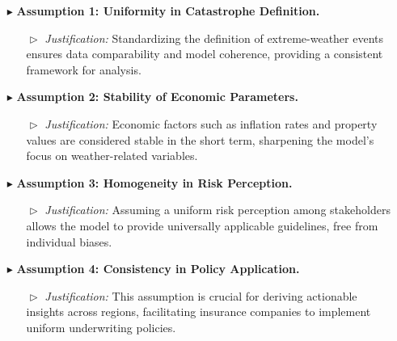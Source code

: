 \documentclass{mcmthesis}
\begin{document}
\begin{itemize}
    \item[$\blacktriangleright$] \textbf{Assumption 1: Uniformity in Catastrophe Definition.} 
        \begin{itemize}
            \item[$\vartriangleright$] \textit{Justification:} Standardizing the definition of extreme-weather events ensures data comparability and model coherence, providing a consistent framework for analysis.
        \end{itemize}
    
    \item[$\blacktriangleright$] \textbf{Assumption 2: Stability of Economic Parameters.}
        \begin{itemize}
            \item[$\vartriangleright$] \textit{Justification:} Economic factors such as inflation rates and property values are considered stable in the short term, sharpening the model's focus on weather-related variables.
        \end{itemize}
    
    \item[$\blacktriangleright$] \textbf{Assumption 3: Homogeneity in Risk Perception.}
        \begin{itemize}
            \item[$\vartriangleright$] \textit{Justification:} Assuming a uniform risk perception among stakeholders allows the model to provide universally applicable guidelines, free from individual biases.
        \end{itemize}
    
    \item[$\blacktriangleright$] \textbf{Assumption 4: Consistency in Policy Application.}
        \begin{itemize}
            \item[$\vartriangleright$] \textit{Justification:} This assumption is crucial for deriving actionable insights across regions, facilitating insurance companies to implement uniform underwriting policies.
        \end{itemize}
\end{itemize}
\end{document}
